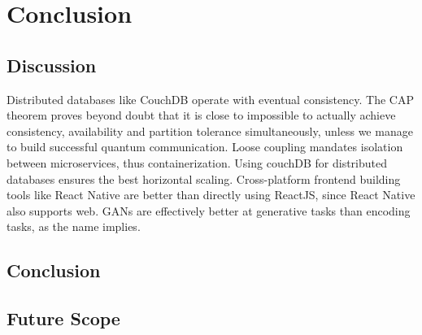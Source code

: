 \chapter{Conclusion}



\section{Discussion}
Distributed databases like CouchDB operate with eventual consistency. The CAP theorem proves beyond doubt that it is close to impossible 
to actually achieve consistency, availability and partition tolerance simultaneously, unless we manage to build successful quantum communication.
Loose coupling mandates isolation between microservices, thus containerization. Using couchDB for distributed databases ensures the best horizontal scaling.
Cross-platform frontend building tools like React Native are better than directly using ReactJS, since React Native also supports web.
GANs are effectively better at generative tasks than encoding tasks, as the name implies.

\section{Conclusion}


\section{Future Scope}

